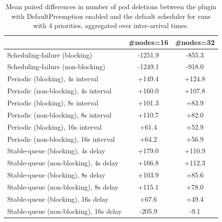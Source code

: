 \begin{table}[t]
\tiny
\setlength{\tabcolsep}{1.2pt}
\renewcommand{\arraystretch}{1.12}
\centering
\caption{Mean paired differences in number of pod deletions between the plugin with DefaultPreemption enabled and the default scheduler for runs with 4 priorities, aggregated over inter-arrival times.}
\label{tab:deletions-defpreempt1-prio4-std0-agg-arrival}
\begin{tabular}{l c c}
\toprule
 & \#nodes=16 & \#nodes=32 \\
\midrule
Scheduling-failure (blocking) & -1251.9 & -855.3 \\
Scheduling-failure (non-blocking) & -1249.1 & -918.0 \\
Periodic (blocking), 4s interval & +149.4 & +124.8 \\
Periodic (non-blocking), 4s interval & +160.0 & +107.8 \\
Periodic (blocking), 8s interval & +101.3 & +83.9 \\
Periodic (non-blocking), 8s interval & +110.7 & +82.0 \\
Periodic (blocking), 16s interval & +61.4 & +52.9 \\
Periodic (non-blocking), 16s interval & +64.2 & +56.9 \\
Stable-queue (blocking), 4s delay & +179.0 & +110.9 \\
Stable-queue (non-blocking), 4s delay & +166.8 & +112.3 \\
Stable-queue (blocking), 8s delay & +103.9 & +85.6 \\
Stable-queue (non-blocking), 8s delay & +115.1 & +78.0 \\
Stable-queue (blocking), 16s delay & +67.6 & +49.4 \\
Stable-queue (non-blocking), 16s delay & -205.9 & -9.1 \\
\bottomrule
\end{tabular}
\end{table}
